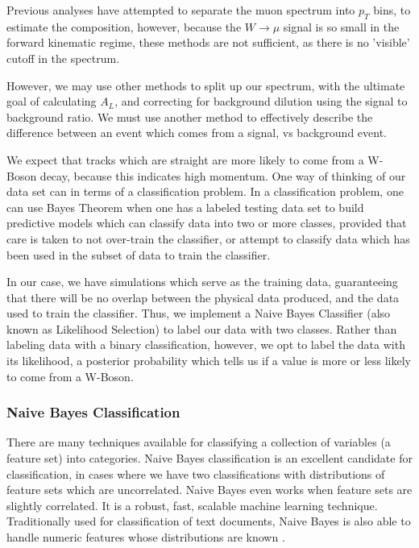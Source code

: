 Previous analyses have attempted to separate the muon spectrum into $p_T$ bins,
to estimate the composition, however, because the $W\rightarrow\mu$ signal is so
small in the forward kinematic regime, these methods are not sufficient, as
there is no 'visible' cutoff in the spectrum.

However, we may use other methods to split up our spectrum, with the ultimate
goal of calculating $A_L$, and correcting for background dilution using the
signal to background ratio. We must use another method to effectively describe
the difference between an event which comes from a signal, vs background event.

We expect that tracks which are straight are more likely to come from a W-Boson
decay, because this indicates high momentum. One way of thinking of our data set
can in terms of a classification problem. In a classification problem, one can
use Bayes Theorem when one has a labeled testing data set to build predictive
models which can classify data into two or more classes, provided that care is
taken to not over-train the classifier, or attempt to classify data which has
been used in the subset of data to train the classifier.

In our case, we have simulations which serve as the training data, guaranteeing
that there will be no overlap between the physical data produced, and the data
used to train the classifier. Thus, we implement a Naive Bayes Classifier (also
known as Likelihood Selection) to label our data with two classes. Rather than
labeling data with a binary classification, however, we opt to label the data
with its likelihood, a posterior probability which tells us if a value is more
or less likely to come from a W-Boson.

\subsubsection{Naive Bayes Classification}
There are many techniques available for classifying a collection of variables
(a feature set) into categories. Naive Bayes classification is an excellent
candidate for classification, in cases where we have two classifications with
distributions of feature sets which are uncorrelated. Naive Bayes even works when
feature sets are slightly correlated. It is a robust, fast, scalable machine
learning technique. Traditionally used for classification of text documents,
Naive Bayes is also able to handle numeric features whose distributions are
known \cite{Collins2013}.

